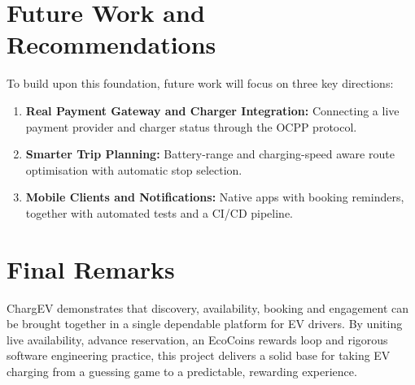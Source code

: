 \documentclass{tietreport}
\begin{document}
\section{Future Work and Recommendations}

To build upon this foundation, future work will focus on
three key directions:

\begin{enumerate}
  \item \textbf{Real Payment Gateway and Charger
    Integration:} Connecting a live payment provider and
    charger status through the OCPP protocol.
  \item \textbf{Smarter Trip Planning:} Battery-range and
    charging-speed aware route optimisation with
    automatic stop selection.
  \item \textbf{Mobile Clients and Notifications:} Native
    apps with booking reminders, together with automated
    tests and a CI/CD pipeline.
\end{enumerate}

\section{Final Remarks}

ChargEV demonstrates that discovery, availability, booking
and engagement can be brought together in a single
dependable platform for EV drivers. By uniting live
availability, advance reservation, an EcoCoins rewards
loop and rigorous software engineering practice, this
project delivers a solid base for taking EV charging from a
guessing game to a predictable, rewarding experience.

\nocite{*}
\printbibliography[heading=bibintoc]
\end{document}
